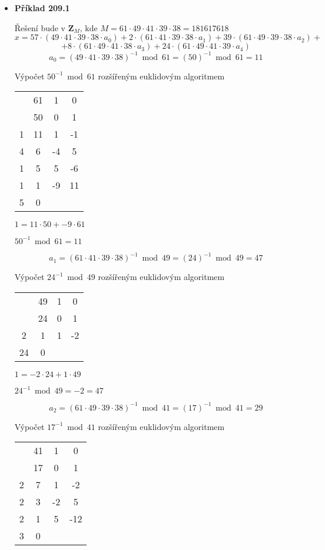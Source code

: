 \documentclass[a4paper,12pt]{report}
\begin{document}
\begin{itemize}
\renewcommand{\labelitemi}{$\filledtriangleright$}
\item \textbf{Příklad 209.1}

Řešení bude v \(\textbf{Z}_M\), kde \(M = 61\cdot49\cdot41\cdot39\cdot38 = 181617618\)
$$x = 57\cdot(49\cdot 41\cdot 39\cdot 38\cdot a_0) + 2\cdot(61\cdot 41\cdot 39\cdot 38\cdot a_1) + 39\cdot(61\cdot 49\cdot 39\cdot 38\cdot a_2) + $$
$$ + 8\cdot(61\cdot 49\cdot 41\cdot 38\cdot a_3) + 24\cdot(61\cdot 49\cdot 41\cdot 39\cdot a_4)$$
$$a_0 = (49\cdot 41\cdot 39\cdot 38)^{-1} \bmod 61 = (50)^{-1} \bmod 61 = 11$$
\begin{center}Výpočet \(50^{-1} \bmod 61\) rozšířeným euklidovým algoritmem

\begin{tabular}{cc|cc}&61&1&0\\
&50&0&1\\
\hline
1&11&1&-1\\
4&6&-4&5\\
1&5&5&-6\\
1&1&-9&11\\
5&0
\end{tabular}

\(1 = 11\cdot 50 + -9\cdot 61\)

\(50^{-1} \bmod 61 = 11\)
\end{center}
$$a_1 = (61\cdot 41\cdot 39\cdot 38)^{-1} \bmod 49 = (24)^{-1} \bmod 49 = 47$$
\begin{center}Výpočet \(24^{-1} \bmod 49\) rozšířeným euklidovým algoritmem

\begin{tabular}{cc|cc}&49&1&0\\
&24&0&1\\
\hline
2&1&1&-2\\
24&0
\end{tabular}

\(1 = -2\cdot 24 + 1\cdot 49\)

\(24^{-1} \bmod 49 = -2 = 47\)
\end{center}
$$a_2 = (61\cdot 49\cdot 39\cdot 38)^{-1} \bmod 41 = (17)^{-1} \bmod 41 = 29$$
\begin{center}Výpočet \(17^{-1} \bmod 41\) rozšířeným euklidovým algoritmem

\begin{tabular}{cc|cc}&41&1&0\\
&17&0&1\\
\hline
2&7&1&-2\\
2&3&-2&5\\
2&1&5&-12\\
3&0
\end{tabular}


\end{center}
\end{itemize}
\end{document}
